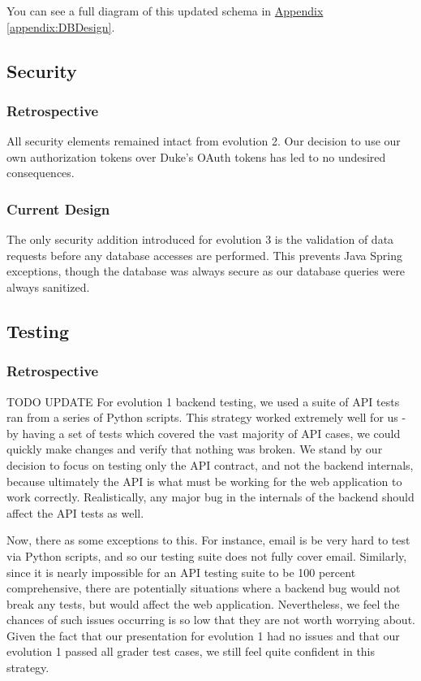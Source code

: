 \documentclass[12pt]{article}
\begin{document}
You can see a full diagram of this updated schema in  \hyperref[appendix:DBDesign]{Appendix \ref{appendix:DBDesign}}. 

\subsection{Security}
\subsubsection{Retrospective}
All security elements remained intact from evolution 2. Our decision to use our own authorization tokens over Duke's OAuth tokens has led to no undesired consequences. 

\subsubsection{Current Design}

The only security addition introduced for evolution 3 is the validation of data requests before any database accesses are performed. This prevents Java Spring exceptions, though the database was always secure as our database queries were always sanitized. 


\subsection{Testing}
\subsubsection{Retrospective}
{\huge TODO UPDATE}
For evolution 1 backend testing, we used a suite of API tests ran from a series of Python scripts. This strategy worked extremely well for us - by having a set of tests which covered the vast majority of API cases, we could quickly make changes and verify that nothing was broken. We stand by our decision to focus on testing only the API contract, and not the backend internals, because ultimately the API is what must be working for the web application to work correctly. Realistically, any major bug in the internals of the backend should affect the API tests as well.


Now, there as some exceptions to this. For instance, email is be very hard to test via Python scripts, and so our testing suite does not fully cover email. Similarly, since it is nearly impossible for an API testing suite to be 100 percent comprehensive, there are potentially situations where a backend bug would not break any tests, but would affect the web application. Nevertheless, we feel the chances of such issues occurring is so low that they are not worth worrying about. Given the fact that our presentation for evolution 1 had no issues and that our evolution 1 passed all grader test cases, we still feel quite confident in this strategy. 
\end{document}
